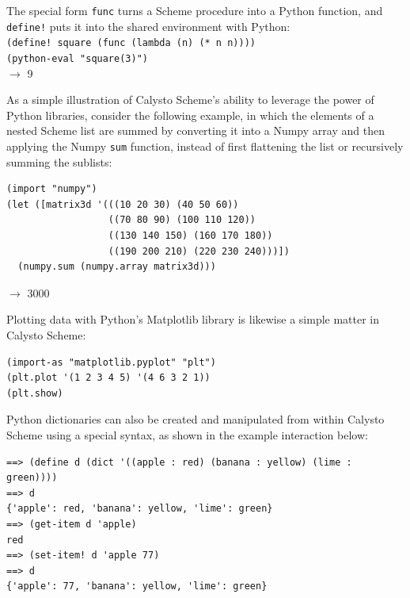 \documentclass[acmsmall,screen,anonymous,review]{acmart}
\begin{document}
\noindent
The special form \texttt{func} turns a Scheme procedure into a Python function,
and \texttt{define!} puts it into the shared environment with Python:\\

{\small
\noindent
\texttt{(define! square (func (lambda (n) (* n n))))}\\
\texttt{(python-eval "square(3)")}\\
$\rightarrow$ 9\\
}

\noindent
As a simple illustration of Calysto Scheme's ability to leverage the power of
Python libraries, consider the following example, in which the elements of a
nested Scheme list are summed by converting it into a Numpy array and then
applying the Numpy \texttt{sum} function, instead of first flattening the list
or recursively summing the sublists:\\

\noindent
\begin{minipage}{\textwidth}
{\small
\begin{verbatim}
(import "numpy")
(let ([matrix3d '(((10 20 30) (40 50 60))
                  ((70 80 90) (100 110 120))
                  ((130 140 150) (160 170 180))
                  ((190 200 210) (220 230 240)))])
  (numpy.sum (numpy.array matrix3d)))
\end{verbatim}
$\rightarrow$ 3000\\
}
\end{minipage}

\noindent
Plotting data with Python's Matplotlib library is likewise a simple matter in
Calysto Scheme:\\

{\small
\begin{verbatim}
(import-as "matplotlib.pyplot" "plt")
(plt.plot '(1 2 3 4 5) '(4 6 3 2 1))
(plt.show)

\end{verbatim}
}

\noindent
Python dictionaries can also be created and manipulated from within Calysto
Scheme using a special syntax, as shown in the example interaction below:\\

\noindent
\begin{minipage}{\textwidth}
{\small
\begin{verbatim}
==> (define d (dict '((apple : red) (banana : yellow) (lime : green))))
==> d
{'apple': red, 'banana': yellow, 'lime': green}
==> (get-item d 'apple)
red
==> (set-item! d 'apple 77)
==> d
{'apple': 77, 'banana': yellow, 'lime': green}
\end{verbatim}
}
\end{minipage}
\end{document}
